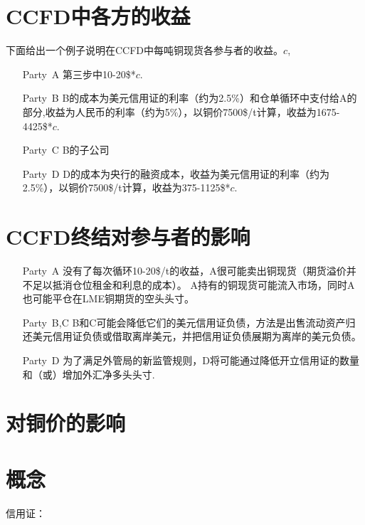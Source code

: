 \documentclass{article}
\begin{document}
\section{CCFD中各方的收益}
下面给出一个例子说明在CCFD中每吨铜现货各参与者的收益。$c$,
\begin{itemize}
    \item[Party\ A] 第三步中10-20\$*$c$.
    \item[Party\ B] B的成本为美元信用证的利率（约为2.5\%）和仓单循环中支付给A的部分,收益为人民币的利率（约为5\%），以铜价7500\$/t计算，收益为1675-4425\$*$c$.
    \item[Party\ C] B的子公司
    \item[Party\ D] D的成本为央行的融资成本，收益为美元信用证的利率（约为2.5\%），以铜价7500\$/t计算，收益为375-1125\$*$c$.
\end{itemize}

\section{CCFD终结对参与者的影响}
\begin{itemize}
    \item[Party\ A] 没有了每次循环10-20\$/t的收益，A很可能卖出铜现货（期货溢价并不足以抵消仓位租金和利息的成本）。
                    A持有的铜现货可能流入市场，同时A也可能平仓在LME铜期货的空头头寸。
    \item[Party\ B,C] B和C可能会降低它们的美元信用证负债，方法是出售流动资产归还美元信用证负债或借取离岸美元，并把信用证负债展期为离岸的美元负债。
    \item[Party\ D] 为了满足外管局的新监管规则，D将可能通过降低开立信用证的数量和（或）增加外汇净多头头寸.
\end{itemize}

\section{对铜价的影响}

\section{概念}
信用证：
\end{document}
